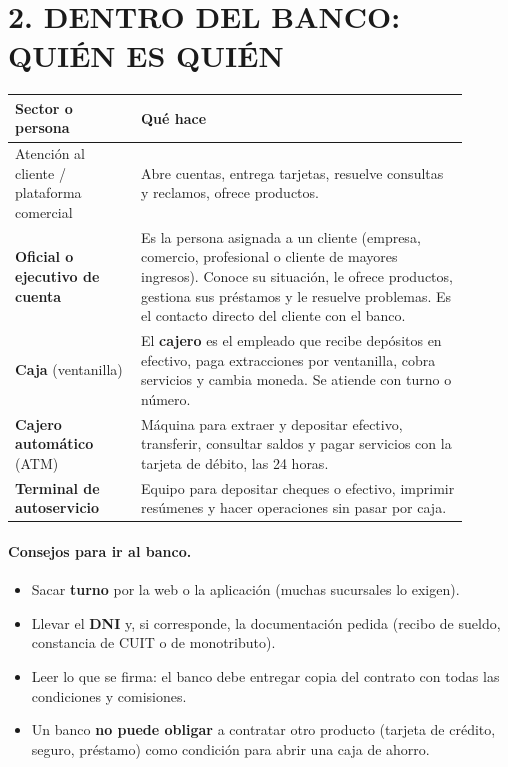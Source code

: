 \section*{2. DENTRO DEL BANCO: QUIÉN ES QUIÉN}

\begin{center}
\small
\begin{tabular}{|p{0.25\linewidth}|p{0.65\linewidth}|}
\hline
\textbf{Sector o persona} & \textbf{Qué hace} \\ \hline
Atención al cliente / plataforma comercial & Abre cuentas, entrega tarjetas, resuelve
consultas y reclamos, ofrece productos. \\ \hline
\textbf{Oficial o ejecutivo de cuenta} & Es la persona asignada a un cliente (empresa,
comercio, profesional o cliente de mayores ingresos). Conoce su situación, le ofrece
productos, gestiona sus préstamos y le resuelve problemas. Es el contacto directo del cliente
con el banco. \\ \hline
\textbf{Caja} (ventanilla) & El \textbf{cajero} es el empleado que recibe depósitos en
efectivo, paga extracciones por ventanilla, cobra servicios y cambia moneda. Se atiende con
turno o número. \\ \hline
\textbf{Cajero automático} (ATM) & Máquina para extraer y depositar efectivo, transferir,
consultar saldos y pagar servicios con la tarjeta de débito, las 24 horas. \\ \hline
\textbf{Terminal de autoservicio} & Equipo para depositar cheques o efectivo, imprimir
resúmenes y hacer operaciones sin pasar por caja. \\ \hline
\end{tabular}
\end{center}

\paragraph*{Consejos para ir al banco.}
\begin{itemize}
  \item Sacar \textbf{turno} por la web o la aplicación (muchas sucursales lo exigen).
  \item Llevar el \textbf{DNI} y, si corresponde, la documentación pedida (recibo de sueldo,
        constancia de CUIT o de monotributo).
  \item Leer lo que se firma: el banco debe entregar copia del contrato con todas las
        condiciones y comisiones.
  \item Un banco \textbf{no puede obligar} a contratar otro producto (tarjeta de crédito,
        seguro, préstamo) como condición para abrir una caja de ahorro.
\end{itemize}

